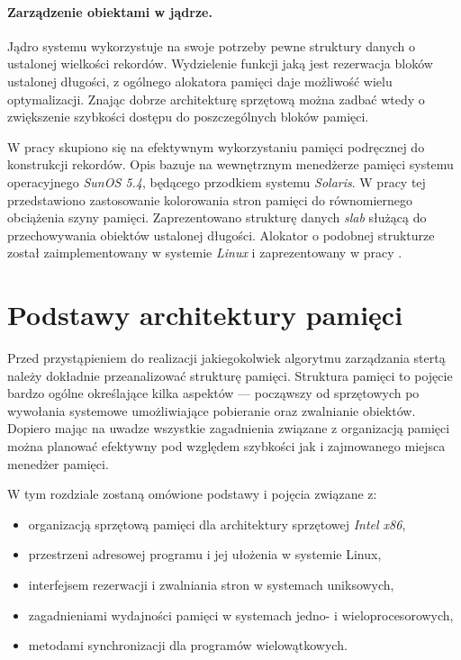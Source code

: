 \documentclass[12pt,a4paper,titlepage,twoside]{mwart}
\begin{document}
\paragraph{Zarządzenie obiektami w jądrze.}

Jądro systemu wykorzystuje na swoje potrzeby pewne struktury danych o ustalonej
wielkości rekordów. Wydzielenie funkcji jaką jest rezerwacja bloków
ustalonej długości, z ogólnego alokatora pamięci daje możliwość wielu
optymalizacji. Znając dobrze architekturę sprzętową można zadbać wtedy o
zwiększenie szybkości dostępu do poszczególnych bloków pamięci.

W pracy \cite{bonwick94slab} skupiono się na efektywnym wykorzystaniu pamięci
podręcznej do konstrukcji rekordów. Opis bazuje na wewnętrznym menedżerze
pamięci systemu operacyjnego \textit{SunOS 5.4}, będącego przodkiem systemu
\textit{Solaris}. W pracy tej przedstawiono zastosowanie kolorowania stron
pamięci do równomiernego obciążenia szyny pamięci. Zaprezentowano strukturę
danych \textit{slab} służącą do przechowywania obiektów ustalonej długości.
Alokator o podobnej strukturze został zaimplementowany w systemie
\textit{Linux} i zaprezentowany w pracy \cite{fitzgibbons00linux}.

\newpage


\section{Podstawy architektury pamięci}
\hypertarget{Architektura}{}

Przed przystąpieniem do realizacji jakiegokolwiek algorytmu zarządzania stertą
należy dokładnie przeanalizować strukturę pamięci. Struktura pamięci to pojęcie
bardzo ogólne określające kilka aspektów --- począwszy od sprzętowych po
wywołania systemowe umożliwiające pobieranie oraz zwalnianie obiektów. Dopiero
mając na uwadze wszystkie zagadnienia związane z organizacją pamięci można
planować efektywny pod względem szybkości jak i zajmowanego miejsca menedżer
pamięci.

W tym rozdziale zostaną omówione podstawy i pojęcia związane z:
\begin{itemize}
\item organizacją sprzętową pamięci dla architektury sprzętowej \textit{Intel x86},
\item przestrzeni adresowej programu i jej ułożenia w systemie Linux,
\item interfejsem rezerwacji i zwalniania stron w systemach uniksowych,
\item zagadnieniami wydajności pamięci w systemach jedno- i wieloprocesorowych,
\item metodami synchronizacji dla programów wielowątkowych.
\end{itemize}
\end{document}
